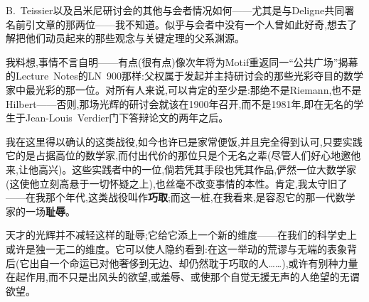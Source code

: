 B.~Teissier以及吕米尼研讨会的其他与会者情况如何——尤其是与Deligne共同署名前引文章的那两位——我不知道。似乎与会者中没有一个人曾如此好奇,想去了解把他们动员起来的那些观念与关键定理的父系渊源。

我料想,事情不言自明——有点(很有点)像次年将为Motif重返同一“公共广场”揭幕的Lecture~Notes的LN~900那样:父权属于发起并主持研讨会的那些光彩夺目的数学家中最光彩的那一位。对所有人来说,可以肯定的至少是:那绝不是Riemann,也不是Hilbert——否则,那场光辉的研讨会\dmark{}就该在1900年召开,而不是1981年,即在无名的学生于Jean-Louis~Verdier门下答辩论文的两年之后。

我在这里得以确认的这类战役,如今也许已是家常便饭,并且完全得到认可,只要实践它的是占据高位的数学家,而付出代价的那位只是个无名之辈(尽管人们好心地邀他来,让他高兴)。这些实践者中的一位,倘若凭其手段也凭其作品,俨然一位大数学家(这使他立刻高悬于一切怀疑之上),也丝毫不改变事情的本性。肯定,我太守旧了——在我那个年代,这类战役叫作\textbf{巧取};而这一桩,在我看来,是容忍它的那一代数学家的一场\textbf{耻辱}。

天才的光辉并不减轻这样的耻辱;它给它添上一个新的维度——在我们的科学史上或许是独一无二的维度。它\dmark{}可以使人隐约看到:在这一举动的荒谬与无端的表象背后(它出自一个命运已对他奢侈到无边、却仍然耽于巧取的人……),或许有别种力量在起作用,而不只是出风头的欲望,或羞辱、或使那个自觉无援无声的人绝望的无谓欲望。

